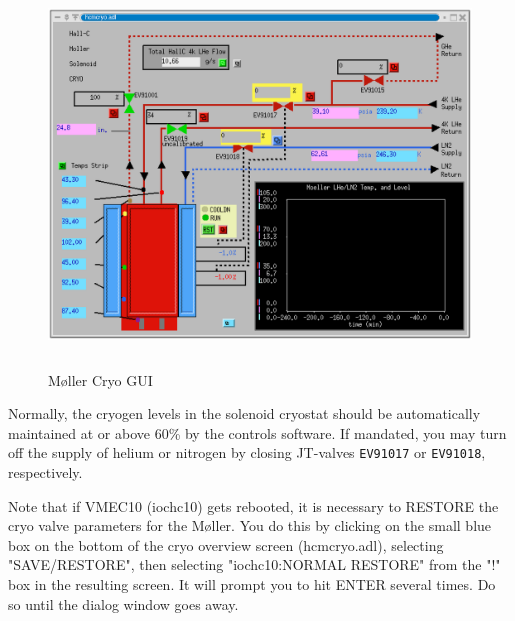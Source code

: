 \begin{figure}
\begin{center}
\includegraphics[height=4in]{beamline/molcryogui.ps}
\caption{M\o ller Cryo GUI\label{molcryomedm}}
\end{center}
\end{figure}
%

Normally, the cryogen levels in the solenoid cryostat should be
automatically maintained at or above 60\% by the controls software.
If mandated, you may turn off the supply of helium or nitrogen by
closing JT-valves {\tt EV91017} or {\tt EV91018}, respectively.

Note that if VMEC10 (iochc10) gets rebooted, it is necessary to RESTORE the cryo valve
parameters for the M\o ller. You do this by clicking on the small blue box on the
bottom of the cryo overview screen (hcmcryo.adl), selecting "SAVE/RESTORE",
then selecting "iochc10:NORMAL RESTORE" from the "!" box in the resulting
screen. It will prompt you to hit ENTER several times. Do so until the dialog
window goes away.

